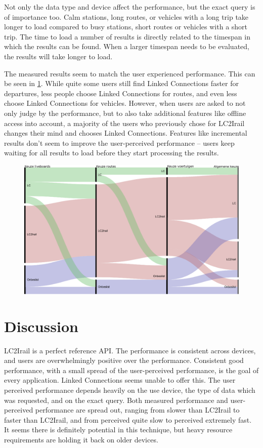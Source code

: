\documentclass[twocolumn]{phdsymp} %
\begin{document}
Not only the data type and device affect the performance, but the exact query is of importance too. Calm stations, long routes, or vehicles with a long trip take longer to load compared to busy stations, short routes or vehicles with a short trip. The time to load a number of results is directly related to the timespan in which the results can be found. When a larger timespan needs to be evaluated, the results will take longer to load.

The measured results seem to match the user experienced performance. This can be seen in \ref{fig:choices}. While quite some users still find Linked Connections faster for departures, less people choose Linked Connections for routes, and even less choose Linked Connections for vehicles. However, when users are asked to not only judge by the performance, but to also take additional features like offline access into account, a majority of the users who previously chose for LC2Irail changes their mind and chooses Linked Connections. Features like incremental results don't seem to improve the user-perceived performance -- users keep waiting for all results to load before they start processing the results.

\begin{figure}[ht]
	\begin{center}
		\includegraphics[width=.40\textwidth]{images/alluvial_user_choice.eps}
		\caption{\label{fig:choices} }
	\end{center}
\end{figure}

\section{Discussion}

LC2Irail is a perfect reference API. The performance is consistent across devices, and users are overwhelmingly positive over the performance. Consistent good performance, with a small spread of the user-perceived performance, is the goal of every application. Linked Connections seems unable to offer this. The user perceived performance depends heavily on the use device, the type of data which was requested, and on the exact query. Both measured performance and user-perceived performance are spread out, ranging from slower than LC2Irail to faster than LC2Irail, and from perceived quite slow to perceived extremely fast. It seems there is definitely potential in this technique, but heavy resource requirements are holding it back on older devices. 
\end{document}
